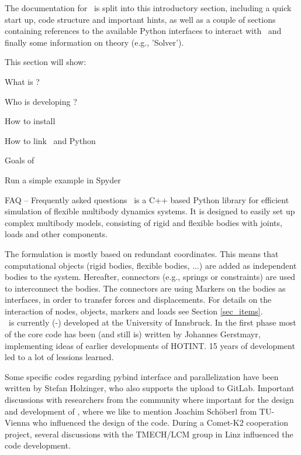 
The documentation for \codeName\ is split into this introductory section, including a quick start up, code structure and important hints, 
as well as a couple of sections containing references to the available Python interfaces to interact with \codeName\ and finally some information on theory (e.g., 'Solver').

This section will show:
\bn
	\item What is \codeName ?
	\item Who is developing \codeName ?
	\item How to install \codeName\ 
	\item How to link \codeName\ and Python
	\item Goals of \codeName
	\item Run a simple example in Spyder
	\item FAQ -- Frequently asked questions
\en
%
\codeName\ is a C++ based Python library for efficient simulation of flexible multibody dynamics systems.
It is designed to easily set up complex multibody models, consisting of rigid and flexible bodies with joints, loads and other components.

The formulation is mostly based on redundant coordinates. This means that computational objects (rigid bodies, flexible bodies, ...) are added as independent bodies to the system. Hereafter, connectors (e.g., springs or constraints) are used to interconnect the bodies. The connectors are using Markers on the bodies as interfaces, in order to transfer forces and displacements.
For details on the interaction of nodes, objects, markers and loads see Section \ref{sec_items}.
\vspace{6pt}\\
%
\codeName\ is currently (\the\month-\the\year) developed at the University of Innsbruck.
In the first phase most of the core code has been (and still is) written by Johannes Gerstmayr, implementing ideas of earlier developments of HOTINT. 15 years of development led to a lot of lessions learned.

Some specific codes regarding pybind interface and parallelization have been written by Stefan Holzinger, who also supports the upload to GitLab.
Important discussions with researchers from the community where important for the design and development of \codeName , where we like to mention Joachim Sch{\"o}berl from TU-Vienna who influenced the design of the code. During a Comet-K2 cooperation project, several discussions with the TMECH/LCM group in Linz influenced the code development.

